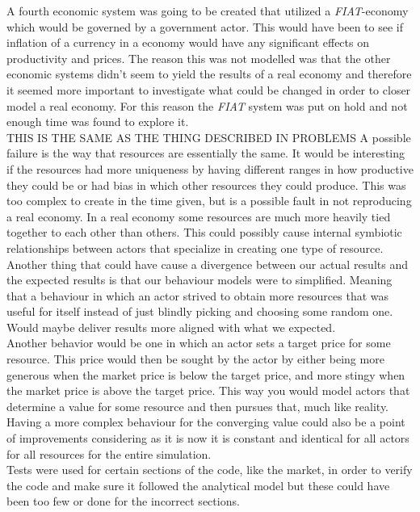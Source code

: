 \documentclass[11p]{article}
\begin{document}
A fourth economic system was going to be created that utilized a \textit{FIAT}-economy which would be governed by a government actor. This would have been to see if inflation of a currency in a economy would have any significant effects on productivity and prices. The reason this was not modelled was that the other economic systems didn't seem to yield the results of a real economy and therefore it seemed more important to investigate what could be changed in order to closer model a real economy. For this reason the \textit{FIAT} system was put on hold and not enough time was found to explore it.
\\

THIS IS THE SAME AS THE THING DESCRIBED IN PROBLEMS
A possible failure is the way that resources are essentially the same. It would be interesting if the resources had more uniqueness by having different ranges in how productive they could be or had bias in which other resources they could produce. This was too complex to create in the time given, but is a possible fault in not reproducing a real economy. In a real economy some resources are much more heavily tied together to each other than others. This could possibly cause internal symbiotic relationships between actors that specialize in creating one type of resource.
\\
Another thing that could have cause a divergence between our actual results and the expected results is that our behaviour models were to simplified. Meaning that a behaviour in which an actor strived to obtain more resources that was useful for itself instead of just blindly picking and choosing some random one. Would maybe deliver results more aligned with what we expected.
\\

Another behavior would be one in which an actor sets a target price for some resource. This price would then be sought by the actor by either being more generous when the market price is below the target price, and more stingy when the market price is above the target price. This way you would model actors that determine a value for some resource and then pursues that, much like reality.
\\

Having a more complex behaviour for the converging value could also be a point of improvements considering as it is now it is constant and  identical for all actors for all resources for the entire simulation.
\\

Tests were used for certain sections of the code, like the market, in order to verify the code and make sure it followed the analytical model but these could have been too few or done for the incorrect sections.
\end{document}
